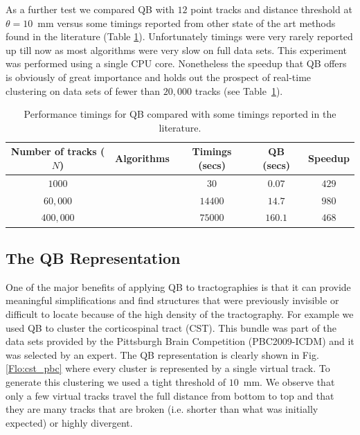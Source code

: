 \documentclass[journal]{IEEEtran}
\begin{document}
As a further test we compared QB with $12$ point tracks and distance
threshold at $\theta=10$~mm versus some timings reported from other
state of the art methods found in the literature (Table
\ref{Flo:timings}). Unfortunately timings were very rarely reported up
till now as most algorithms were very slow on full data sets. This
experiment was performed using a single CPU core. Nonetheless the
speedup that QB offers is obviously of great importance and holds out
the prospect of real-time clustering on data sets of fewer than $20,000$
tracks (see Table~\ref{Flo:timings}).

%
\begin{table}
\scriptsize\addtolength{\tabcolsep}{-5pt}
\caption{Performance timings for QB compared with some timings
  reported in the literature.\label{Flo:timings}}
\begin{centering}
\begin{tabular}{ccccc}
\hline 
Number of tracks ($N$) & Algorithms & Timings (secs) & QB (secs) & Speedup\tabularnewline
\hline
$1000$ & \cite{wang2010tractography} & $30$ & $0.07$ & $429$\tabularnewline
$60,000$ & \cite{wang2010tractography} & $14400$ & $14.7$ & $980$\tabularnewline
$400,000$ & \cite{Visser2010} & $75000$ & $160.1$ & $468$\tabularnewline
\hline
\end{tabular}
\par\end{centering}
\end{table}

\subsection{The QB Representation}

One of the major benefits of applying QB to tractographies is that it
can provide meaningful simplifications and find structures that were
previously invisible or difficult to locate because of the high density
of the tractography. For example we used QB to cluster the corticospinal
tract (CST). This bundle was part of the data sets provided by the
Pittsburgh Brain Competition (PBC2009-ICDM) and it was selected by an
expert. The QB representation is clearly shown in Fig.\ref{Flo:cst_pbc} where
every cluster is represented by a single virtual track. To generate this
clustering we used a tight threshold of $10$~mm. We observe that only a
few virtual tracks travel the full distance from bottom to top and that
they are many tracks that are broken (i.e. shorter than what was
initially expected) or highly divergent.
\end{document}
